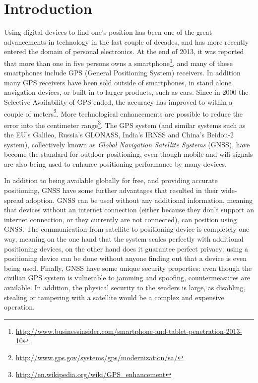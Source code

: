 \chapter{Introduction}

Using digital devices to find one's position has been one of the great advancements in technology in the last couple of decades, and has more recently entered the domain of personal electronics.
At the end of 2013, it was reported that more than one in five persons owns a smartphone\footnote{\url{http://www.businessinsider.com/smartphone-and-tablet-penetration-2013-10}}, and many of these smartphones include GPS (General Positioning System) receivers.
In addition many GPS receivers have been sold outside of smartphones, in stand alone navigation devices, or built in to larger products, such as cars.
Since in 2000 the Selective Availability of GPS ended, the accuracy has improved to within a couple of meters\footnote{\url{http://www.gps.gov/systems/gps/modernization/sa/}}.
More technological enhancements are possible to reduce the error into the centimeter range\footnote{\url{http://en.wikipedia.org/wiki/GPS_enhancement}}.
The GPS system (and similar systems such as the EU's Galileo, Russia's GLONASS, India's IRNSS and China's Beidou-2 system), collectively known as \emph{Global Navigation Satellite Systems} (GNSS), have become the standard for outdoor positioning, even though mobile and wifi signals are also being used to enhance positioning performance by many devices.

In addition to being available globally for free, and providing accurate positioning, GNSS have some further advantages that resulted in their wide-spread adoption.
GNSS can be used without any additional information, meaning that devices without an internet connection (either because they don't support an internet connection, or they currently are not connected), can position using GNSS.
The communication from satellite to positioning device is completely one way, meaning on the one hand that the system scales perfectly with additional positioning devices, on the other hand does it guarantee perfect privacy: using a positioning device can be done without anyone finding out that a device is even being used.
Finally, GNSS have some unique security properties: even though the civilian GPS system is vulnerable to jamming and spoofing\citep{volpe2001vulnerability,grant2009gps}, countermeasures are available\citep{warner2003gps,lo2009signal}.
In addition, the physical security to the senders is large, as disabling, stealing or tampering with a satellite would be a complex and expensive operation.

